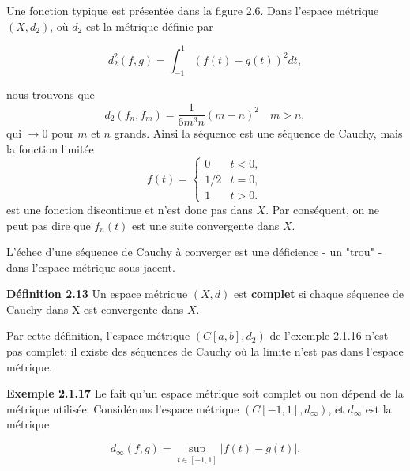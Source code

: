 \documentclass[10pt,twoside,a4paper]{book}
\begin{document}
\noindent
Une fonction typique est présentée dans la figure 2.6. Dans l'espace métrique $(X, d_2)$, où $d_2$ est la métrique définie par

\begin{equation*}
  d_2^2(f, g) = \int_{-1}^{1}(f(t) - g(t))^2 dt,
\end{equation*}


\noindent
nous trouvons que
\begin{equation*}
  d_2(f_n, f_m) = \frac{1}{6m^3n}(m - n)^2 \quad m > n,
\end{equation*}
\noindent
qui $\longrightarrow 0$ pour $m$ et $n$ grands. Ainsi la séquence est une séquence de Cauchy, mais la fonction limitée
\begin{equation*}
  f(t) = \begin{cases} 0 & t < 0, \\
    1/2 & t = 0, \\
    1 & t > 0.
        \end{cases}
\end{equation*}
\noindent
est une fonction discontinue et n'est donc pas dans $X$. Par conséquent, on ne peut pas dire que $f_n(t)$ est une suite convergente dans $X$.

\vspace{2mm}
L'échec d'une séquence de Cauchy à converger est une déficience - un "trou" - dans l'espace métrique sous-jacent.

\vspace{4mm}
\noindent
\textbf{Définition 2.13} Un espace métrique $(X, d)$ est \textbf{complet} si chaque séquence de Cauchy dans X est convergente dans $X$.

\noindent
Par cette définition, l'espace métrique $(C[a, b], d_2)$ de l'exemple 2.1.16 n'est pas complet: il existe des séquences de Cauchy où la limite n'est pas dans l'espace métrique.

\vspace{4mm}
\noindent
\textbf{Exemple 2.1.17} Le fait qu'un espace métrique soit complet ou non dépend de la métrique utilisée. Considérons l'espace métrique $(C[-1, 1], d_\infty)$, et $d_\infty$ est la métrique

\begin{equation*}
  d_\infty(f, g) = \sup_{t \in [-1, 1]} |f(t) - g(t)|.
\end{equation*}
\end{document}
